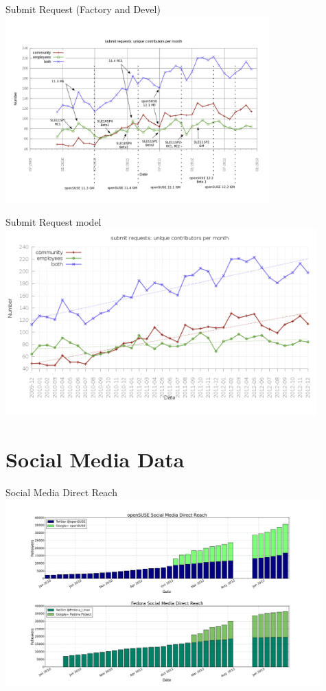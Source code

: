 \documentclass{beamer}
\begin{document}
\begin{frame}{Submit Request (Factory and Devel)}
  \includegraphics[height=7.2cm]{obs_data}
\end{frame}

\begin{frame}{Submit Request model}
  \includegraphics[height=7.2cm]{obs_model}
\end{frame}


\section{Social Media Data}

\begin{frame}{Social Media Direct Reach}
  \includegraphics[height=7.2cm]{social_data}
\end{frame}
\end{document}

